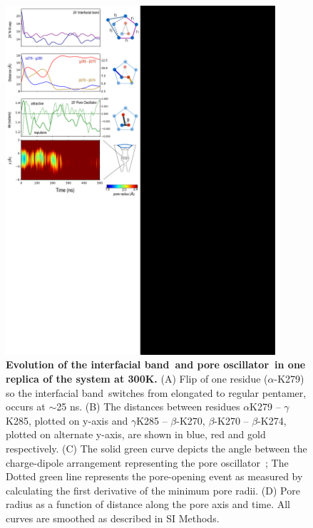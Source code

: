 \documentclass[9pt,onecolumn,oneside,lineno]{pnas-new}
\newcommand{\fivering}{interfacial band~}
\newcommand{\triad}{pore oscillator~}
\begin{document}
\begin{figure}
\begin{center}
\includegraphics[width = 100mm]{figures_2/pore_opening_events_M300_1.pdf}
\end{center}
\caption{{\bf Evolution of the \fivering and \triad in one replica of the \MT system at 300K.} (A)  Flip of one residue ($\alpha$-K279) so the \fivering switches from elongated to regular pentamer, occurs at $\sim$25 ns. (B) The distances between residues $\alpha$K279 -- $\gamma$K285, plotted on y-axis and  $\gamma$K285 -- $\beta$-K270, $\beta$-K270 -- $\beta$-K274, plotted on alternate y-axis, are shown in blue, red and gold respectively. (C) The solid green curve depicts the angle between the charge-dipole arrangement representing the \triad; The Dotted green line represents the pore-opening event as measured by calculating the  first derivative of the minimum pore radii. (D) Pore radius as a function of distance along the pore axis and time.  All curves are smoothed as described in SI Methods.}
\label{fig:K315_1}
\end{figure}
\end{document}
